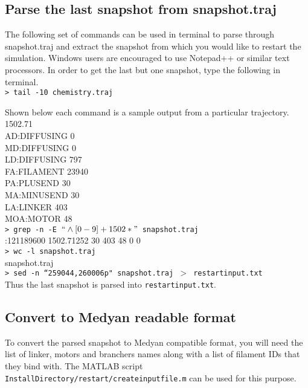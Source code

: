 \documentclass[11pt, oneside]{article}   	%
\begin{document}
\subsection{Parse the last snapshot from snapshot.traj}
The following set of commands can be used in terminal to parse through snapshot.traj and extract the snapshot from which you would like to restart the simulation. Windows users are encouraged to use Notepad++ or similar text processors. 
In order to get the last but one snapshot, type the following in terminal. \\ \newline
\texttt{> tail -10 chemistry.traj} \newline

Shown below each command is a sample output from a particular trajectory. \\
 1502.71 \\
\indent AD:DIFFUSING 0\\
\indent MD:DIFFUSING 0\\
\indent LD:DIFFUSING 797\\
\indent FA:FILAMENT 23940\\
\indent PA:PLUSEND 30\\
\indent MA:MINUSEND 30\\
\indent LA:LINKER 403\\
\indent MOA:MOTOR 48\\

\noindent \texttt{> grep -n -E $``\wedge{}[0-9]+ 1502*"$ snapshot.traj}  \\ 

:121189600 1502.71252 30 403 48 0 0 \\ 

\noindent \texttt{> wc -l snapshot.traj}  \\ 

 snapshot.traj \\ 

\noindent \texttt{> sed -n ``259044,260006p" snapshot.traj $>$ restartinput.txt} \\ 
Thus the last snapshot is parsed into \texttt{restartinput.txt}.

\subsection{Convert to Medyan readable format}
To convert the parsed snapshot to Medyan compatible format, you will need the list of linker, motors and branchers names along with a list of filament IDs that they bind with. The MATLAB script \texttt{InstallDirectory/restart/createinputfile.m} can be used for this purpose.\\
\end{document}
